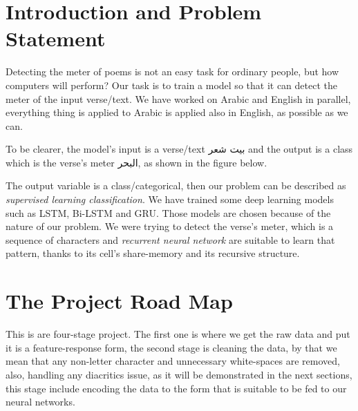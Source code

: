 \documentclass[12pt]{article}
\begin{document}




\section{Introduction and Problem Statement}
Detecting the meter of poems is not an easy task for ordinary people, but how
computers will perform? Our task is to train a model so that it can detect the
meter of the input verse/text.
We have worked on Arabic and English in parallel, everything thing is applied to
Arabic is applied also in English, as possible as we can.

To be clearer, the model's input is a verse/text \textarabic{بيت شعر} and the
output is a class which is the verse's meter \textarabic{البحر}, as shown in the
figure below.


\begin{center}
\end{center}

The output variable is a class/categorical, then our problem can be described as
\textit{supervised learning  classification}.  We have trained some deep learning
models such as LSTM, Bi-LSTM and GRU.  Those models are chosen because of the
nature of our problem. We were trying to detect the verse's meter, which is a
sequence of characters and \textit{recurrent neural network} are suitable  to
learn that pattern, thanks to its cell's share-memory and its recursive
structure.


\section{The Project Road Map}
This is are four-stage project.  The first one is where we get the raw data and
put it is a feature-response form, the second stage is cleaning the data, by that
we mean that any non-letter character and unnecessary white-spaces are removed,
also, handling any diacritics issue, as it will be demonstrated in the next
sections, this stage include encoding the data to the form that is suitable to be
fed to our neural networks. 
\end{document}
